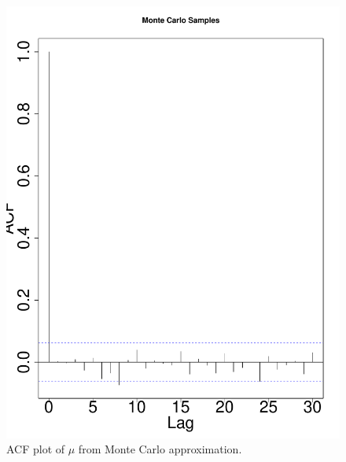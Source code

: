 \documentclass[11pt]{article}
\begin{document}
\begin{enumerate}
\begin{enumerate}
\begin{multicols}{2}
\begin{figure}[H]
\begin{center}
\includegraphics[scale=0.3]{figures/MCacf}
\caption{\label{fig:MCacf} ACF plot of $\mu$ from Monte Carlo approximation.}
\end{center}
\end{figure}


\end{multicols}
\end{enumerate}
\end{enumerate}
\end{document}
